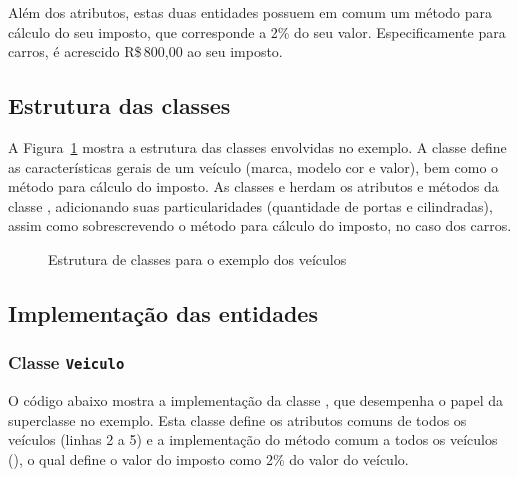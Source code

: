 Além dos atributos, estas duas entidades possuem em comum um método para cálculo do seu imposto, que corresponde a 2\% do seu valor. Especificamente para carros, é acrescido R\$\,800,00 ao seu imposto.

\subsection{Estrutura das classes}

A Figura~\ref{fig:exemplo-carro-moto} mostra a estrutura das classes envolvidas no exemplo. A classe  define as características gerais de um veículo (marca, modelo cor e valor), bem como o método para cálculo do imposto. As classes  e  herdam os atributos e métodos da classe , adicionando suas particularidades (quantidade de portas e cilindradas), assim como sobrescrevendo o método para cálculo do imposto, no caso dos carros.

\begin{figure}[h]
	\centering
	
	
	\caption{Estrutura de classes para o exemplo dos veículos}
	\label{fig:exemplo-carro-moto}
\end{figure}

\subsection{Implementação das entidades}

\subsubsection{Classe \texttt{Veiculo}}

O código abaixo mostra a implementação da classe , que desempenha o papel da superclasse no exemplo. Esta classe define os atributos comuns de todos os veículos (linhas 2 a 5) e a implementação do método comum a todos os veículos (), o qual define o valor do imposto como 2\% do valor do veículo.

